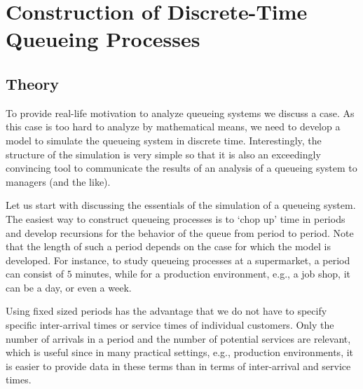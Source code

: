 \section{Construction of Discrete-Time Queueing
  Processes}
\label{sec:constr-discr-time}

\subsection*{Theory}



To provide real-life motivation to analyze queueing systems we discuss a case.  As this case is too hard to analyze by mathematical means,  we need to develop a model to simulate the queueing system in discrete time.  Interestingly, the structure of the simulation is very simple so that  it is also  an exceedingly convincing tool to communicate the results of an analysis of a queueing system to managers (and the like).  

Let us start with discussing the essentials of the simulation of a queueing system. The easiest way  to construct queueing processes is to `chop up' time in periods and develop recursions for the behavior of the queue from period to period. Note that the length of such a period depends on the
case for which the model is developed.  For instance, to study queueing processes at a supermarket, a period can consist of $5$ minutes, while for a production environment, e.g., a job shop, it can
be a day, or even a week.

Using fixed sized periods has the advantage that we do not have to
specify specific inter-arrival times or service times of individual
customers. Only the number of arrivals in a period and the number of
potential services are relevant, which is useful since in many
practical settings, e.g., production environments, it is easier to
provide data in these terms than in terms of inter-arrival and service
times. 

